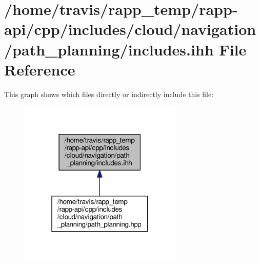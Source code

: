 \hypertarget{cloud_2navigation_2path__planning_2includes_8ihh}{\section{/home/travis/rapp\-\_\-temp/rapp-\/api/cpp/includes/cloud/navigation/path\-\_\-planning/includes.ihh File Reference}
\label{cloud_2navigation_2path__planning_2includes_8ihh}
}
This graph shows which files directly or indirectly include this file\-:
\nopagebreak
\begin{figure}[H]
\begin{center}
\leavevmode
\includegraphics[width=220pt]{cloud_2navigation_2path__planning_2includes_8ihh__dep__incl}
\end{center}
\end{figure}

